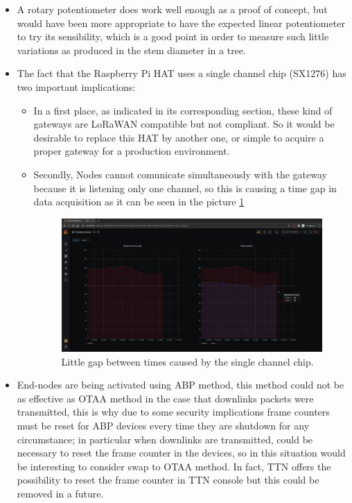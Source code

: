 \documentclass[11pt,a4paper,dvipsnames,twoside]{article}
\begin{document}
\begin{itemize}
  \item A rotary potentiometer does work well enough as a proof of concept, but would have been more appropriate to have the expected linear potentiometer to try its sensibility, which is a good point in order to measure such little variations as produced in the stem diameter in a tree.
  \item The fact that the Raspberry Pi HAT uses a single channel chip (SX1276) has two important implications:
    \begin{itemize}
      \item In a first place, as indicated in its corresponding section, these kind of gateways are LoRaWAN compatible but not compliant. So it would be desirable to replace this HAT by another one, or simple to acquire a proper gateway for a production environment.
      \item Secondly, Nodes cannot comunicate simultaneously with the gateway because it is listening only one channel, so this is causing a time gap in data acquisition as it can be seen in the picture \ref{fig:times_gap}
      \begin{figure}[ht]
        \centering
        \includegraphics[width=.9\textwidth]{../pictures/Grafana_times_gap.png}
        \caption{Little gap between times caused by the single channel chip.}
        \label{fig:times_gap}
      \end{figure}
    \end{itemize}
    \item End-nodes are being activated using ABP method, this method could not be as effective as OTAA method in the case that downlinks packets were transmitted, this is why due to some security implications frame counters must be reset for ABP devices every time they are shutdown for any circumstance; in particular when downlinks are transmitted, could be necessary to reset the frame counter in the devices, so in this situation would be interesting to consider swap to OTAA method. In fact, TTN offers the possibility to reset the frame counter in TTN console but this could be removed in a future.

\end{itemize}
\end{document}
